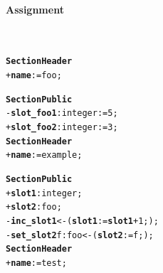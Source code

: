 \documentclass[11pt]{mybook}
\begin{document}
\paragraph{Assignment}  
~\\
\begin{alltt}
{\bf{}Section Header}
  + {\bf{}name} := {\sc{}foo};

{\bf{}Section Public}
  - {\bf{}slot\_foo1}:{\sc{}integer} := 5;
  + {\bf{}slot\_foo2}:{\sc{}integer} := 3;\\

{\bf{}Section Header}
  + {\bf{}name} := {\sc{}example};

{\bf{}Section Public}
  + {\bf{}slot1}:{\sc{}integer};
  + {\bf{}slot2}:{\sc{}foo};
  - {\bf{}inc\_slot1} <- ( {\bf{}slot1} := {\bf{}slot1} + 1; );
  - {\bf{}set\_slot2} f:{\sc{}foo} <- ({\bf{}slot2} := f; );\\

{\bf{}Section Header}
  + {\bf{}name} := {\sc{}test};


\end{alltt}
\end{document}
